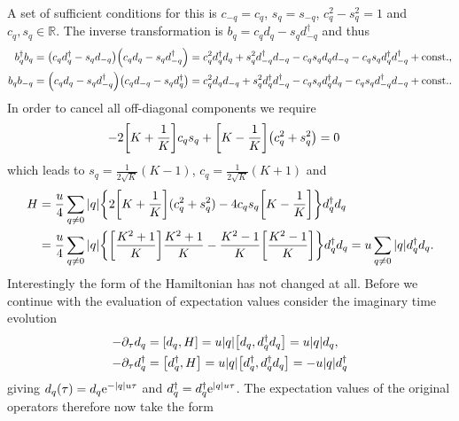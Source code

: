 \documentclass[english, parskip=full]{scrartcl}
\begin{document}
A set of sufficient conditions for this is $c_{-q} = c_q$, $s_q=s_{-q}$, $c_q^2 - s_q^2 = 1$ and  $c_q,s_q\in\mathbb{R}$.
The inverse transformation is $b_q = c_qd_q - s_q d_{-q}^\dagger$ and thus
\begin{align}
b_q^\dagger b_q &= \kla*{c_qd_q^\dagger - s_q d_{-q}} \kla*{c_qd_q - s_q d_{-q}^\dagger} = c_q^2 d_q^\dagger d_q + s_q^2 d_{-q}^\dagger d_{-q} - c_qs_q d_qd_{-q} - c_qs_q d_q^\dagger d_{-q}^\dagger + \const,\\
b_q b_{-q} &= \kla*{c_qd_q - s_q d_{-q}^\dagger} \kla*{c_qd_{-q} - s_q d_{q}^\dagger} = c_q^2 d_qd_{-q} + s_q^2 d_q^\dagger d_{-q}^\dagger - c_qs_q d_q^\dagger d_q - c_qs_q d_{-q}^\dagger d_{-q} + \const .
\end{align}
In order to cancel all off-diagonal components we require
\begin{align}
-2\klb*{K+\frac{1}{K}} c_qs_q + \klb*{K - \frac{1}{K}} \kla*{c_q^2 + s_q^2} &= 0
\end{align}
which leads to $s_q = \frac{1}{2\sqrt{K}}(K-1)$, $c_q = \frac{1}{2\sqrt{K}} (K+1)$ and
\begin{align}
H &= \frac{u}{4} \sum_{q\neq 0} |q| \klc*{2 \klb*{K+\frac{1}{K}} (c_q^2+s_q^2) - 4c_qs_q\klb*{K-\frac{1}{K}}  }d_q^\dagger d_q\\
&= \frac{u}{4} \sum_{q\neq 0} |q| \klc*{ \klb*{\frac{K^2+1}{K}} \frac{K^2+1}{K} -  \frac{K^2-1}{K} \klb*{\frac{K^2-1}{K}}  }d_q^\dagger d_q = u\sum_{q\neq 0} |q| d_q^\dagger d_q .
\end{align}
Interestingly the form of the Hamiltonian has not changed at all.
Before we continue with the evaluation of expectation values consider the imaginary time evolution
\begin{align}
-\partial_\tau d_q &= \klb*{d_q, H} = u |q| \klb*{d_q, d_q^\dagger d_q} = u|q| d_q,\\
-\partial_\tau d_q^\dagger &= \klb*{d_q^\dagger, H} = u |q| \klb*{d_q^\dagger, d_q^\dagger d_q} = -u|q| d_q^\dagger
\end{align}
giving $d_q(\tau) = d_q \text{e}^{-|q|u\tau}$ and $d_q^\dagger = d_q^\dagger \text{e}^{|q|u\tau}$.
The expectation values of the original operators therefore now take the form
\end{document}
